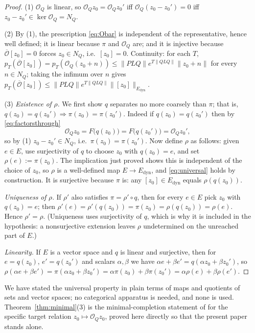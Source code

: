 \documentclass[11pt,reqno]{amsart}
\numberwithin{equation}{section}
\theoremstyle{plain}
\theoremstyle{definition}
\theoremstyle{remark}
\newcommand{\Edyn}{E_{\mathrm{dyn}}}
\newcommand{\Op}{\mathcal{O}_{Q}}
\begin{document}
\begin{proof}
(1) $\Op$ is linear, so $\Op z_{0}=\Op z_{0}'$ iff $\Op(z_{0}-z_{0}')=0$ iff
$z_{0}-z_{0}'\in\ker\Op=N_{Q}$.

(2) By (1), the prescription \eqref{eq:Obar} is independent of the representative, hence well
defined; it is linear because $\pi$ and $\Op$ are; and it is injective because
$\overline{\mathcal{O}}[z_{0}]=0$ forces $z_{0}\in N_{Q}$, i.e.\ $[z_{0}]=0$. Continuity: for
each $T$, $p_{T}(\overline{\mathcal{O}}[z_{0}])=p_{T}(\Op(z_{0}+n))\le
\lVert PLQ\rVert e^{T\lVert QLQ\rVert}\lVert z_{0}+n\rVert$ for every $n\in N_{Q}$; taking the
infimum over $n$ gives
$p_{T}(\overline{\mathcal{O}}[z_{0}])\le\lVert PLQ\rVert e^{T\lVert QLQ\rVert}
\lVert[z_{0}]\rVert_{\Edyn}$.

(3) \emph{Existence of $\rho$.} We first show $q$ separates no more coarsely than $\pi$; that
is, $q(z_{0})=q(z_{0}')\Rightarrow\pi(z_{0})=\pi(z_{0}')$. Indeed if $q(z_{0})=q(z_{0}')$ then
by \eqref{eq:factorsthrough}
\[
\Op z_{0}=F\bigl(q(z_{0})\bigr)=F\bigl(q(z_{0}')\bigr)=\Op z_{0}' ,
\]
so by (1) $z_{0}-z_{0}'\in N_{Q}$, i.e.\ $\pi(z_{0})=\pi(z_{0}')$. Now define $\rho$ as
follows: given $e\in E$, use surjectivity of $q$ to choose $z_{0}$ with $q(z_{0})=e$, and set
$\rho(e):=\pi(z_{0})$. The implication just proved shows this is independent of the choice of
$z_{0}$, so $\rho$ is a well-defined map $E\to\Edyn$, and \eqref{eq:universal} holds by
construction. It is surjective because $\pi$ is: any $[z_{0}]\in\Edyn$ equals
$\rho(q(z_{0}))$.

\emph{Uniqueness of $\rho$.} If $\rho'$ also satisfies $\pi=\rho'\circ q$, then for every
$e\in E$ pick $z_{0}$ with $q(z_{0})=e$; then
$\rho'(e)=\rho'(q(z_{0}))=\pi(z_{0})=\rho(q(z_{0}))=\rho(e)$. Hence $\rho'=\rho$. (Uniqueness
uses surjectivity of $q$, which is why it is included in the hypothesis: a nonsurjective
extension leaves $\rho$ undetermined on the unreached part of $E$.)

\emph{Linearity.} If $E$ is a vector space and $q$ is linear and surjective, then for
$e=q(z_{0})$, $e'=q(z_{0}')$ and scalars $\alpha,\beta$ we have
$\alpha e+\beta e'=q(\alpha z_{0}+\beta z_{0}')$, so
$\rho(\alpha e+\beta e')=\pi(\alpha z_{0}+\beta z_{0}')
=\alpha\pi(z_{0})+\beta\pi(z_{0}')=\alpha\rho(e)+\beta\rho(e')$.
\end{proof}

We have stated the universal property in plain terms of maps and quotients of sets and vector
spaces; no categorical apparatus is needed, and none is used. Theorem~\ref{thm:minimal}(3) is
the minimal-completion statement of \cite{Paper3} for the specific target relation
$z_{0}\mapsto\Op z_{0}$, proved here directly so that the present paper stands alone.
\end{document}
